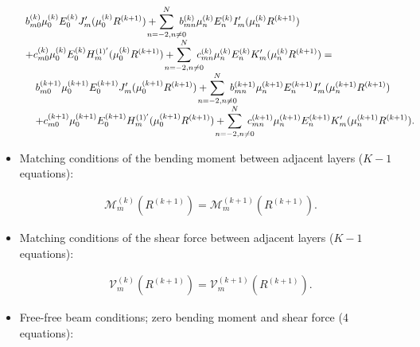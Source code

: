 \documentclass{jfm}
\begin{document}
\begin{itemize}
\begin{eqnarray}
\begin{array}{l}
\displaystyle  b_{m0}^{(k)}\mu^{(k)}_0E_0^{(k)}J'_m(\mu^{(k)}_0 R^{(k+1)})+ \hspace{-4mm} \sum_{n=-2,n\ne 0}^{N}\hspace{-3mm} b^{(k)}_{mn} \mu^{(k)}_nE_n^{(k)}I'_m(\mu^{(k)}_n R^{(k+1)}) \\
\displaystyle +c_{m0}^{(k)}\mu^{(k)}_0E_0^{(k)}H_m^{(1)'}(\mu^{(k)}_0 R^{(k+1)}) +\hspace{-4mm} \sum_{n=-2,n\ne 0}^{N}\hspace{-3mm} c^{(k)}_{mn}\mu^{(k)}_nE_n^{(k)} K'_m(\mu^{(k)}_n R^{(k+1)}) =\\
\displaystyle \quad  b_{m0}^{(k+1)}\mu^{(k+1)}_0E_0^{(k+1)}J'_m(\mu^{(k+1)}_0 R^{(k+1)})+ \hspace{-4mm} \sum_{n=-2,n\ne 0}^{N}\hspace{-3mm} b^{(k+1)}_{mn}\mu^{(k+1)}_n E_n^{(k+1)}I'_m(\mu^{(k+1)}_n R^{(k+1)}) \\
\displaystyle \quad +c_{m0}^{(k+1)}\mu^{(k+1)}_0E_0^{(k+1)}H_m^{(1)'}(\mu^{(k+1)}_0 R^{(k+1)}) +\hspace{-4mm} \sum_{n=-2,n\ne 0}^{N}\hspace{-3mm} c^{(k+1)}_{mn}\mu^{(k+1)}_nE_n^{(k+1)} K'_m(\mu^{(k+1)}_n R^{(k+1)}).
\end{array}
\end{eqnarray}


  \item 
Matching conditions of the bending moment between adjacent layers ($K-1$ equations):

\begin{eqnarray}
\mathcal{M}_m^{(k)} (R^{(k+1)}) = \mathcal{M}_m^{(k+1)} (R^{(k+1)}).
\end{eqnarray}

  \item 
Matching conditions of the shear force between adjacent layers ($K-1$ equations):

\begin{eqnarray}
\mathcal{V}_m^{(k)} (R^{(k+1)}) = \mathcal{V}_m^{(k+1)} (R^{(k+1)}).
\end{eqnarray}

  \item 
Free-free beam conditions; zero bending moment and shear force (4 equations):



\end{itemize}
\end{document}
